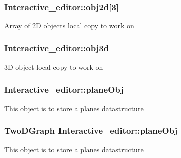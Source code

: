 \subsubsection[{\texorpdfstring{obj2d}{obj2d}}]{ Interactive\+\_\+editor\+::obj2d\mbox{[}3\mbox{]}}\hypertarget{classInteractive__editor_a0974df86dfc8021afda1fcc07907671a}{}\label{classInteractive__editor_a0974df86dfc8021afda1fcc07907671a}
Array of 2D objects local copy to work on 
\subsubsection[{\texorpdfstring{obj3d}{obj3d}}]{ Interactive\+\_\+editor\+::obj3d}\hypertarget{classInteractive__editor_ab0a5452e01c787797bad0624452bf555}{}\label{classInteractive__editor_ab0a5452e01c787797bad0624452bf555}
3D object local copy to work on 
\subsubsection[{\texorpdfstring{plane\+Obj}{planeObj}}]{ Interactive\+\_\+editor\+::plane\+Obj}\hypertarget{classInteractive__editor_ace6d6a503a0b62b7a8b6f87177dca677}{}\label{classInteractive__editor_ace6d6a503a0b62b7a8b6f87177dca677}
This object is to store a plane\textquotesingle{}s datastructure 
\subsubsection[{\texorpdfstring{plane\+Obj}{planeObj}}]{\setlength{\rightskip}{0pt plus 5cm}Two\+D\+Graph Interactive\+\_\+editor\+::plane\+Obj}\hypertarget{classInteractive__editor_aed0bc7a1d2cafae39f3fbf2eb119649c}{}\label{classInteractive__editor_aed0bc7a1d2cafae39f3fbf2eb119649c}
This object is to store a plane\textquotesingle{}s datastructure 
